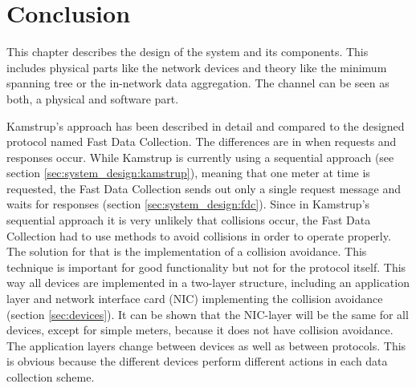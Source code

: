 \section{Conclusion}
\label{sec:design:conclusion}

This chapter describes the design of the system and its components. This includes physical parts like the network devices and theory like the minimum spanning tree or the in-network data aggregation. The channel can be seen as both, a physical and software part.

Kamstrup's approach has been described in detail and compared to the designed protocol named Fast Data Collection. The differences are in when requests and responses occur. While Kamstrup is currently using a sequential approach (see section \ref{sec:system_design:kamstrup}), meaning that one meter at time is requested, the Fast Data Collection sends out only a single request message and waits for responses (section \ref{sec:system_design:fdc}). Since in Kamstrup's sequential approach it is very unlikely that collisions occur, the Fast Data Collection had to use methods to avoid collisions in order to operate properly. The solution for that is the implementation of a collision avoidance. This technique is important for good functionality but not for the protocol itself. This way all devices are implemented in a two-layer structure, including an application layer and network interface card (NIC) implementing the collision avoidance (section \ref{sec:devices}). It can be shown that the NIC-layer will be the same for all devices, except for simple meters, because it does not have collision avoidance. The application layers change between devices as well as between protocols. This is obvious because the different devices perform different actions in each data collection scheme.

